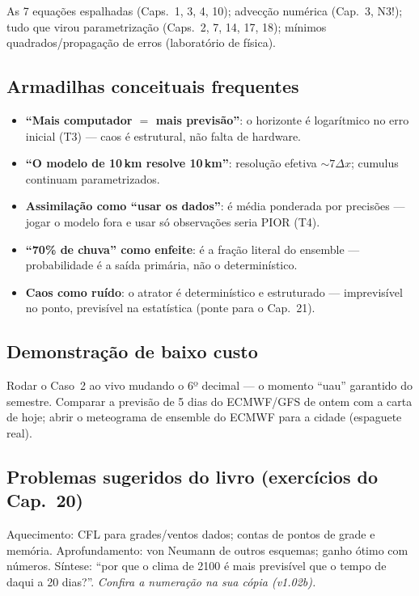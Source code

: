 As 7 equações espalhadas (Caps.~1, 3, 4, 10); advecção numérica
(Cap.~3, N3!); tudo que virou parametrização (Caps.~2, 7, 14, 17,
18); mínimos quadrados/propagação de erros (laboratório de física).

\subsection*{Armadilhas conceituais frequentes}

\begin{itemize}
  \item \textbf{``Mais computador $=$ mais previsão''}: o horizonte é
        logarítmico no erro inicial (T3) — caos é estrutural, não
        falta de hardware.
  \item \textbf{``O modelo de 10\,km resolve 10\,km''}: resolução
        efetiva $\sim7\Delta x$; cumulus continuam parametrizados.
  \item \textbf{Assimilação como ``usar os dados''}: é média
        ponderada por precisões — jogar o modelo fora e usar só
        observações seria PIOR (T4).
  \item \textbf{``70\% de chuva'' como enfeite}: é a fração literal
        do ensemble — probabilidade é a saída primária, não o
        determinístico.
  \item \textbf{Caos como ruído}: o atrator é determinístico e
        estruturado — imprevisível no ponto, previsível na
        estatística (ponte para o Cap.~21).
\end{itemize}

\subsection*{Demonstração de baixo custo}

Rodar o Caso~2 ao vivo mudando o 6º decimal — o momento
``uau'' garantido do semestre. Comparar a previsão de 5 dias do
ECMWF/GFS de ontem com a carta de hoje; abrir o meteograma de
ensemble do ECMWF para a cidade (espaguete real).

\subsection*{Problemas sugeridos do livro (exercícios do Cap.~20)}

Aquecimento: CFL para grades/ventos dados; contas de pontos de grade
e memória. Aprofundamento: von Neumann de outros esquemas; ganho
ótimo com números. Síntese: ``por que o clima de 2100 é mais
previsível que o tempo de daqui a 20 dias?''.
\emph{Confira a numeração na sua cópia (v1.02b).}

